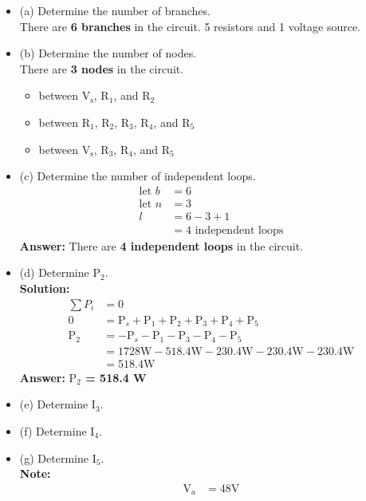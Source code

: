 \documentclass{article}
\begin{document}
\begin{itemize}
	\item (a) Determine the number of branches. \\
	There are \textbf{6 branches} in the circuit. 5 resistors and 1 voltage source.
	\item (b) Determine the number of nodes. \\
		There are \textbf{3 nodes} in the circuit.
		\begin{itemize}
			\item between $\text{V}_\text{s}$, $\text{R}_\text{1}$, and $\text{R}_\text{2}$
			\item between $\text{R}_\text{1}$, $\text{R}_\text{2}$, $\text{R}_\text{3}$, $\text{R}_\text{4}$, and $\text{R}_\text{5}$
			\item between $\text{V}_\text{s}$, $\text{R}_\text{3}$, $\text{R}_\text{4}$, and $\text{R}_\text{5}$
		\end{itemize}
	\item (c) Determine the number of independent loops.
		\begin{align*}
			\text{let } b &= 6 \\
			\text{let } n &= 3 \\
			l &= 6 - 3 + 1 \\
			&= 4 \text{ independent loops}
		\end{align*}
		\textbf{Answer:} There are \textbf{4 independent loops} in the circuit.
	\item (d) Determine $\text{P}_2$. \\
		\textbf{Solution:}
		\begin{align*}
			\sum{P_i} &= 0 \\
			0 &= \text{P}_s + \text{P}_1 + \text{P}_2 + \text{P}_3 + \text{P}_4 + \text{P}_5 \\
			 \text{P}_2 &= -\text{P}_s - \text{P}_1 - \text{P}_3 - \text{P}_4 - \text{P}_5 \\
			&= 1728  \text{W} - 518.4 \text{W} - 230.4 \text{W} - 230.4 \text{W} - 230.4 \text{W} \\
			&= 518.4 \text{W}
		\end{align*}
		\textbf{Answer:} \textbf{$\text{P}_{2}$ = 518.4 W}
	\item (e) Determine $\text{I}_3$.
	\item (f) Determine $\text{I}_4$.
	\item (g) Determine $\text{I}_5$. \\
		\textbf{Note:}
		\begin{align*}
			\text{V}_a &= 48 \text{V} \\

\end{align*}
\end{itemize}
\end{document}
